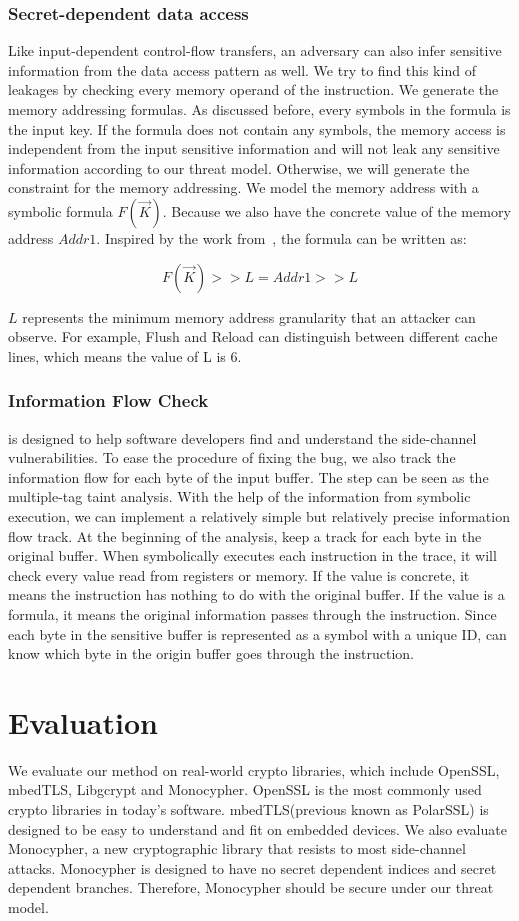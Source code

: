 \subsubsection{Secret-dependent data access}
Like input-dependent control-flow transfers, an adversary can also infer sensitive information from the data access pattern as well. We try to find this kind of leakages by checking every memory operand of the instruction. We generate the memory addressing 
formulas. As discussed before, every symbols in the formula is the input key. If the formula does not contain any symbols, the memory access is independent 
from the input sensitive information and will not leak any sensitive information according to our threat model. Otherwise, we will generate the constraint for
the memory addressing. We model the memory address with a symbolic formula $F(\vec{K})$. Because we also have the concrete value of the memory address $Addr1$. 
Inspired by the work from~\cite{203878}, the formula can be written as:

$$F(\vec{K}) >> L = Addr1 >> L$$

$L$ represents the minimum memory address granularity that an attacker can observe. For example, Flush and Reload can distinguish between different cache lines, which means the value of L is 6.

\subsubsection{Information Flow Check}
\tool{} is designed to help software developers find and understand the side-channel vulnerabilities. To ease the procedure of fixing the bug, we also track the information flow for each byte of the input
buffer. 
The step can be seen as the multiple-tag taint analysis. With the help of the information from symbolic execution, we can implement a relatively simple but relatively precise information flow track.
At the beginning of the analysis, \tool{} keep a track for each byte in 
the original buffer. When \tool{} symbolically executes each instruction in the trace, it will check every value read from registers or memory. If the value is concrete, it means the instruction has nothing to do with the original buffer.
If the value is a formula, it means the original information passes through the instruction. Since each byte in the sensitive buffer is represented as a symbol with a unique ID, \tool{} can know which byte in the origin buffer goes through the instruction.

\section{Evaluation}
We evaluate our method on real-world crypto libraries, which include  OpenSSL, mbedTLS, Libgcrypt and Monocypher\@. OpenSSL is the most commonly used crypto libraries in today's software. mbedTLS\@ (previous known as PolarSSL) is designed to be easy to understand and fit on embedded devices. We also evaluate Monocypher, a new cryptographic library that resists to most side-channel attacks. 
Monocypher is designed to have no secret dependent indices and secret dependent branches. Therefore, Monocypher should be secure under our threat model.

